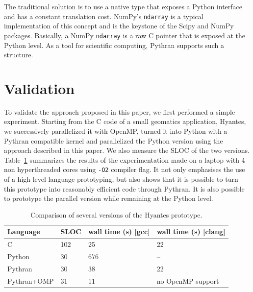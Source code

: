 \documentclass{sigplanconf}
\begin{document}
The traditional solution is to use a native type that exposes a Python interface
and has a constant translation cost. NumPy's \texttt{ndarray} is a typical
implementation of this concept and is the keystone of the Scipy and NumPy
packages. Basically, a NumPy \texttt{ndarray} is a raw C pointer that is exposed
at the Python level. As a tool for scientific computing, Pythran supports such a
structure.

\section{Validation}\label{sec:validation}

To validate the approach proposed in this paper, we first performed a simple
experiment. Starting from the C code of a small geomatics application, Hyantes,
we successively parallelized it with OpenMP, turned it into Python with a
Pythran compatible kernel and parallelized the Python version using the approach
described in this paper. We also measure the SLOC of the two versions.
Table~\ref{tbl:hyantes} summarizes the results of the experimentation made on a
laptop with 4 non hyperthreaded cores using \texttt{-O2} compiler flag. It not
only emphasises the use of a high level language prototyping, but also shows
that it is possible to turn this prototype into reasonably efficient code
through Pythran. It is also possible to prototype the parallel version while
remaining at the Python level.

\begin{table}

    \caption{Comparison of several versions of the Hyantes prototype.}
    \label{tbl:hyantes}

    \centering
    \begin{tabular}{|l|l|l|l|}
        \hline
        Language & SLOC & wall time (s) [gcc] & wall time (s) [clang]\\
        \hline
        C       & 102   & 25 & 22 \\
        Python  & 30    & 676 & --\\
        Pythran & 30    & 38 &  22 \\
        Pythran+OMP    & 31    & 11 & no OpenMP support\\
        \hline
    \end{tabular}

\end{table}
\end{document}
